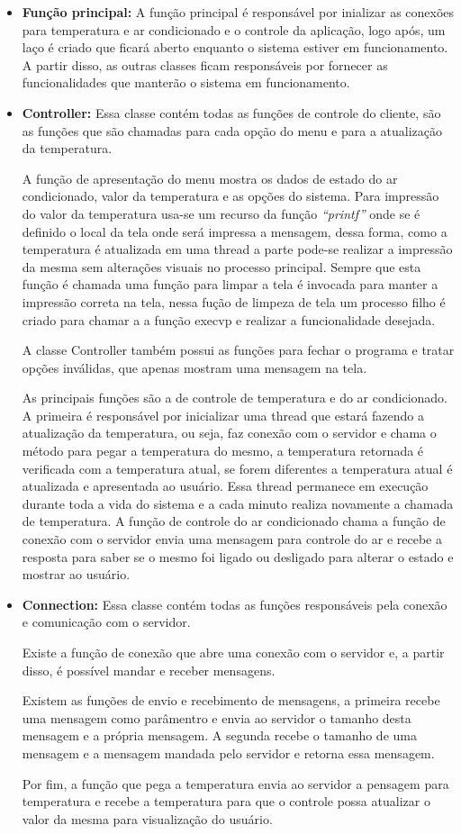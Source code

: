 \documentclass[journal,transmag]{IEEEtran}
\begin{document}
\begin{itemize}
	\item \textbf{Função principal:}
		A função principal é responsável por inializar as conexões para temperatura e ar condicionado e o controle da aplicação, logo após, um laço é criado que ficará aberto enquanto o sistema estiver em funcionamento. A partir disso, as outras classes ficam responsáveis por fornecer as funcionalidades que manterão o sistema em funcionamento.
	\item \textbf{Controller:}
		Essa classe contém todas as funções de controle do cliente, são as funções que são chamadas para cada opção do menu e para a atualização da temperatura.

		A função de apresentação do menu mostra os dados de estado do ar condicionado, valor da temperatura e as opções do sistema. Para impressão do valor da temperatura usa-se um recurso da função \textit{``printf''} onde se é definido o local da tela onde será impressa a mensagem, dessa forma, como a temperatura é atualizada em uma thread a parte pode-se realizar a impressão da mesma sem alterações visuais no processo principal. Sempre que esta função é chamada uma função para limpar a tela é invocada para manter a impressão correta na tela, nessa fução de limpeza de tela um processo filho é criado para chamar a a função execvp e realizar a funcionalidade desejada.

		A classe Controller também possui as funções para fechar o programa e tratar opções inválidas, que apenas mostram uma mensagem na tela.

		As principais funções são a de controle de temperatura e do ar condicionado. A primeira é responsável por inicializar uma thread que estará fazendo a atualização da temperatura, ou seja, faz conexão com o servidor e chama o método para pegar a temperatura do mesmo, a temperatura retornada é verificada com a temperatura atual, se forem diferentes a temperatura atual é atualizada e apresentada ao usuário. Essa thread permanece em execução durante toda a vida do sistema e a cada minuto realiza novamente a chamada de temperatura. A função de controle do ar condicionado chama a função de conexão com o servidor envia uma mensagem para controle do ar e recebe a resposta para saber se o mesmo foi ligado ou desligado para alterar o estado e mostrar ao usuário.
	\item \textbf{Connection:}
		Essa classe contém todas as funções responsáveis pela conexão e comunicação com o servidor.

		Existe a função de conexão que abre uma conexão com o servidor e, a partir disso, é possível mandar e receber mensagens.

		Existem as funções de envio e recebimento de mensagens, a primeira recebe uma mensagem como parâmentro e envia ao servidor o tamanho desta mensagem e a própria mensagem. A segunda recebe o tamanho de uma mensagem e a mensagem mandada pelo servidor e retorna essa mensagem.

		Por fim, a função que pega a temperatura envia ao servidor a pensagem para temperatura e recebe a temperatura para que o controle possa atualizar o valor da mesma para visualização do usuário.
\end{itemize}
\end{document}
